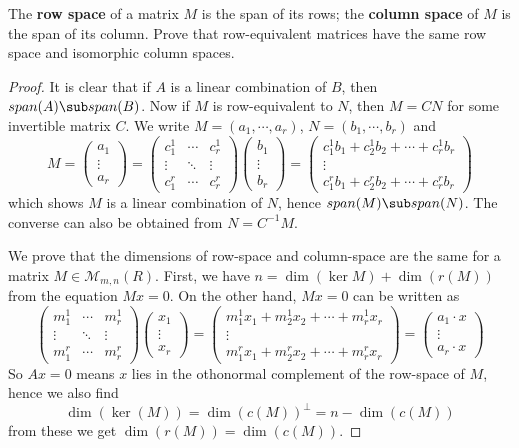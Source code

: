 \begin{exercise}\label{row col spa}
The \textbf{row space} of a matrix $M$ is the span of its rows; the \textbf{column space} of $M$ is the span of its column. Prove that row-equivalent matrices have the same row space and isomorphic column spaces.
\end{exercise}
\begin{proof}
It is clear that if $A$ is a linear combination of $B$, then $span(A)\sub span(B)$. Now if $M$ is row-equivalent to $N$, then $M=CN$ for some invertible matrix $C$. We write $M=(a_1,\cdots,a_r)$, $N=(b_1,\cdots,b_r)$ and
\[M=\begin{pmatrix}
a_1\\
\vdots\\
a_r
\end{pmatrix}=\begin{pmatrix}
c^1_1 &\cdots& c^1_r\\
\vdots &\ddots&\vdots\\
c^r_1 &\cdots &c^r_r
\end{pmatrix}\begin{pmatrix}
b_1\\
\vdots\\
b_r
\end{pmatrix}=\begin{pmatrix}
c^1_1b_1+c^1_2b_2+\cdots+c^1_rb_r\\
\vdots\\
c^r_1b_1+c^r_2b_2+\cdots+c^r_rb_r
\end{pmatrix}\]
which shows $M$ is a linear combination of $N$, hence $span(M)\sub span(N)$. The converse can also be obtained from $N=C^{-1}M$.\par
We prove that the dimensions of row-space and column-space are the same for a matrix $M\in\mathcal{M}_{m,n}(R)$. First, we have $n=\dim(\ker M)+\dim(r(M))$ from the equation $Mx=0$. On the other hand, $Mx=0$ can be written as
\[\begin{pmatrix}
m^1_1 &\cdots& m^1_r\\
\vdots &\ddots&\vdots\\
m^r_1 &\cdots &m^r_r
\end{pmatrix}\begin{pmatrix}
x_1\\
\vdots\\
x_r
\end{pmatrix}=\begin{pmatrix}
m^1_1x_1+m^1_2x_2+\cdots+m^1_rx_r\\
\vdots\\
m^r_1x_1+m^r_2x_2+\cdots+m^r_rx_r
\end{pmatrix}=\begin{pmatrix}
a_1\cdot x\\
\vdots\\
a_r\cdot x
\end{pmatrix}\]
So $Ax=0$ means $x$ lies in the othonormal complement of the row-space of $M$, hence we also find
\[\dim(\ker(M))=\dim(c(M))^{\bot}=n-\dim(c(M))\]
from these we get $\dim(r(M))=\dim(c(M))$.
\end{proof}
